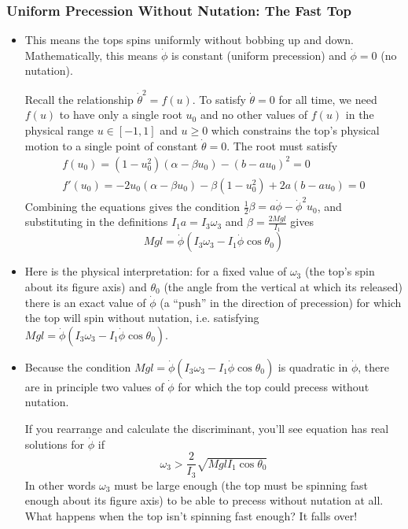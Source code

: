 \documentclass[11pt, a4paper]{article}
\begin{document}
\subsubsection{Uniform Precession Without Nutation: The Fast Top}
\begin{itemize}
	\item This means the tops spins uniformly without bobbing up and down. Mathematically, this means $ \dot{\phi} $ is constant (uniform precession) and $ \dot{\phi} = 0 $ (no nutation). 
	
	Recall the relationship $ \dot{\theta}^{2} = f(u) $. To satisfy $ \dot{\theta} = 0 $ for all time, we need $ f(u) $ to have only a single root $ u_{0} $ and no other values of $ f(u) $ in the physical range $ u \in [-1, 1] $ and $ u \geq 0 $ which constrains the top's physical motion to a single point of constant $ \dot{\theta} = 0 $. The root must satisfy
	\begin{align*}
		f(u_{0}) = (1 - u_{0}^{2})(\alpha - \beta u_{0}) - (b- au_{0})^{2} = 0\\
		f'(u_{0}) = -2u_{0}(\alpha - \beta u_{0}) - \beta(1 - u_{0}^{2}) + 2a(b - au_{0}) = 0
	\end{align*}
	Combining the equations gives the condition $ \frac{1}{2} \beta = a \dot{\phi} - \dot{\phi}^{2}u_{0} $, and substituting in the definitions $ I_{1}a = I_{3} \omega_{3} $ and $ \beta = \frac{2Mgl}{I_{1}} $ gives
	\begin{equation*}
		Mgl = \dot{\phi} (I_{3} \omega_{3} - I_{1}\dot{\phi}\cos \theta_{0}) 
	\end{equation*}
	
	\item Here is the physical interpretation: for a fixed value of $ \omega_{3} $ (the top's spin about its figure axis) and $ \theta_{0} $ (the angle from the vertical at which its released) there is an exact value of $ \dot{\phi} $ (a ``push'' in the direction of precession) for which the top will spin without nutation, i.e. satisfying $ Mgl = \dot{\phi} (I_{3} \omega_{3} - I_{1}\dot{\phi}\cos \theta_{0})  $.
	
	\item Because the condition $ Mgl = \dot{\phi} (I_{3} \omega_{3} - I_{1}\dot{\phi}\cos \theta_{0})  $ is quadratic in $ \dot{\phi} $, there are in principle two values of $ \dot{\phi} $ for which the top could precess without nutation.
	
	If you rearrange and calculate the discriminant, you'll see equation has real solutions for $ \dot{\phi} $ if
	\begin{equation*}
		\omega_{3} > \frac{2}{I_{3}}\sqrt{Mgl I_{1}\cos \theta_{0}}
	\end{equation*}
	In other words $ \omega_{3} $ must be large enough (the top must be spinning fast enough about its figure axis) to be able to precess without nutation at all. What happens when the top isn't spinning fast enough? It falls over!
	
\end{itemize}
\end{document}
